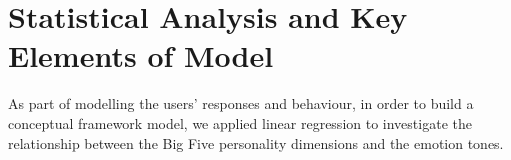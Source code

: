 \documentclass[graybox]{svmult}
\begin{document}
{%

\section{Statistical Analysis and Key Elements of Model}\label{keymodels}

As part of modelling the users' responses and behaviour, in order to
build a conceptual framework model, we applied linear regression to
investigate the relationship between the Big Five personality
dimensions and the emotion tones.


}
\end{document}
